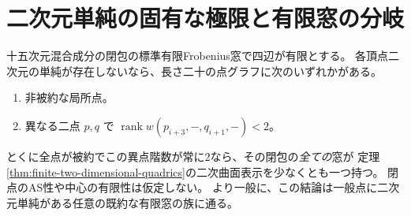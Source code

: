 \section{二次元単純の固有な極限と有限窓の分岐}
\label{sec:finite-two-dimensional-specialization}
\begin{theorem}\label{thm:finite-two-dimensional-specialization}
十五次元混合成分の閉包の標準有限Frobenius窓で四辺が有限とする。
各頂点二次元の単純が存在しないなら、長さ二十の点グラフに次のいずれかがある。
\begin{enumerate}
\item 非被約な局所点。
\item 異なる二点 $p,q$ で $\operatorname{rank} w(p_{i+3},-,q_{i+1},-)<2$。
\end{enumerate}
とくに全点が被約でこの異点階数が常に2なら、その閉包の\emph{全ての}窓が
定理\ref{thm:finite-two-dimensional-quadrics}の二次曲面表示を少なくとも一つ持つ。
閉点のAS性や中心の有限性は仮定しない。
より一般に、この結論は一般点に二次元単純がある任意の既約な有限窓の族に通る。
\end{theorem}
